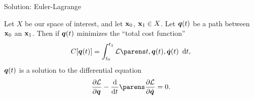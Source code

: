 \documentclass{fkpresentation}
\begin{document}



\begin{frame}{Solution: Euler-Lagrange}
  \begin{theorem}
    Let $X$ be our space of interest, and let $\mathbf{x}_0$, $\mathbf{x}_1 \in X$.
    Let $\bm q(t)$ be a path between $\mathbf{x}_0$ an $\mathbf{x}_1$. Then if
    $\bm q(t)$ minimizes the ``total cost function''
    \[
      C[\Qq(t)] = \int_{t_0}^{t_1} \mc L\pn{t, \Qq(t), \dot{\Qq}(t)} \dd
      t,
    \]
    $\bm q(t)$ is a solution to the differential equation
    \[
      \pd{\mc L}{\Qq} - \od{}{t} \pn{\pd{\mc L}{\dot{\Qq}}} = 0.
    \]
  \end{theorem}
\end{frame}
\end{document}
